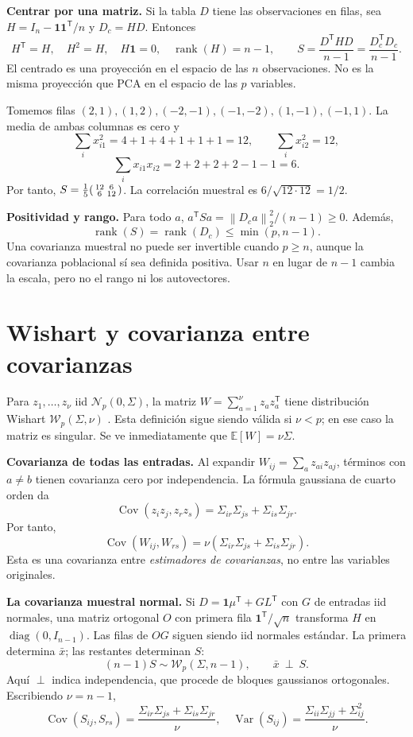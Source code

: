 \documentclass[11pt,a4paper]{article}
\newcommand{\E}{\mathbb E}
\newcommand{\T}{^{\mathsf T}}
\newcommand{\ones}{\mathbf 1}
\newcommand{\norm}[1]{\left\lVert #1\right\rVert}
\DeclareMathOperator{\Var}{Var}
\DeclareMathOperator{\Cov}{Cov}
\DeclareMathOperator{\rank}{rank}
\DeclareMathOperator{\diag}{diag}
\newcommand{\Normal}{\mathcal N}
\newcommand{\topic}[2]{\clearpage\section{#1}\label{#2}}
\theoremstyle{definition}\newtheorem{definicion}[teorema]{Definición}
\begin{document}
\textbf{Centrar por una matriz.}
Si la tabla $D$ tiene las observaciones en filas, sea
$H=I_n-\ones\ones\T/n$ y $D_c=HD$. Entonces
\[
H\T=H,\quad H^2=H,\quad H\ones=0,\quad \rank(H)=n-1,
\qquad S=\frac{D\T HD}{n-1}=\frac{D_c\T D_c}{n-1}.
\]
El centrado es una proyección en el espacio de las $n$ observaciones.
No es la misma proyección que PCA en el espacio de las $p$ variables.

\begin{ejemplo}
Tomemos filas $(2,1),(1,2),(-2,-1),(-1,-2),(1,-1),(-1,1)$.
La media de ambas columnas es cero y
\[
\sum_i x_{i1}^2=4+1+4+1+1+1=12,\qquad
\sum_i x_{i2}^2=12,
\]
\[
\sum_i x_{i1}x_{i2}=2+2+2+2-1-1=6.
\]
Por tanto,
$S=\frac15\begin{psmallmatrix}12&6\\6&12\end{psmallmatrix}$.
La correlación muestral es $6/\sqrt{12\cdot12}=1/2$.
\end{ejemplo}
\textbf{Positividad y rango.}
Para todo $a$, $a\T Sa=\norm{D_ca}_2^2/(n-1)\ge0$.
Además,
\[
\rank(S)=\rank(D_c)\le\min(p,n-1).
\]
Una covarianza muestral no puede ser invertible cuando $p\ge n$,
aunque la covarianza poblacional sí sea definida positiva.
Usar $n$ en lugar de $n-1$ cambia la escala, pero no el rango ni
los autovectores.

\topic{Wishart y covarianza entre covarianzas}{s25}
Para $z_1,\ldots,z_\nu$ iid $\Normal_p(0,\Sigma)$,
la matriz $W=\sum_{a=1}^\nu z_az_a\T$ tiene distribución Wishart
$\mathcal W_p(\Sigma,\nu)$ \cite{wishart}. Esta definición sigue siendo válida si
$\nu<p$; en ese caso la matriz es singular.
Se ve inmediatamente que $\E[W]=\nu\Sigma$.

\textbf{Covarianza de todas las entradas.}
Al expandir $W_{ij}=\sum_a z_{ai}z_{aj}$, términos con $a\ne b$
tienen covarianza cero por independencia.
La fórmula gaussiana de cuarto orden da
\[
\Cov(z_i z_j,z_r z_s)
=\Sigma_{ir}\Sigma_{js}+\Sigma_{is}\Sigma_{jr}.
\]
Por tanto,
\[
\boxed{\Cov(W_{ij},W_{rs})
=\nu(\Sigma_{ir}\Sigma_{js}+\Sigma_{is}\Sigma_{jr})}.
\]
Esta es una covarianza entre \emph{estimadores de covarianzas}, no
entre las variables originales.

\textbf{La covarianza muestral normal.}
Si $D=\ones\mu\T+G L\T$ con $G$ de entradas iid normales,
una matriz ortogonal $O$ con primera fila $\ones\T/\sqrt n$ transforma
$H$ en $\diag(0,I_{n-1})$. Las filas de $OG$ siguen siendo iid normales
estándar. La primera determina $\bar x$; las restantes determinan $S$:
\[
(n-1)S\sim\mathcal W_p(\Sigma,n-1),\qquad \bar x\ \perp\ S.
\]
Aquí $\perp$ indica independencia, que procede de bloques gaussianos
ortogonales. Escribiendo $\nu=n-1$,
\[
\boxed{\Cov(S_{ij},S_{rs})
=\frac{\Sigma_{ir}\Sigma_{js}+\Sigma_{is}\Sigma_{jr}}{\nu}},
\quad
\Var(S_{ij})=\frac{\Sigma_{ii}\Sigma_{jj}+\Sigma_{ij}^2}{\nu}.
\]
\end{document}
